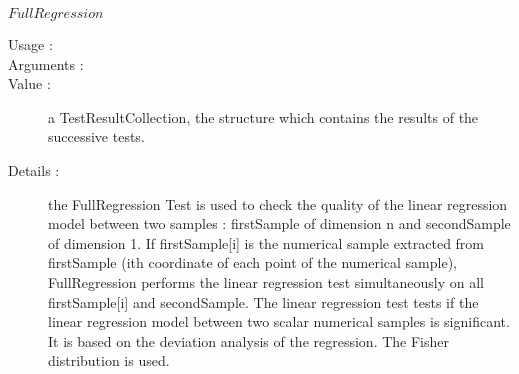 \begin{description}
\begin{description}
  \item $FullRegression$
    \begin{description}
    \item[Usage :] \rule{0pt}{1em}
    \item[Arguments :] \rule{0pt}{1em}
    \item[Value :]  a TestResultCollection, the structure which contains the results of the successive tests.
    \item[Details :] the FullRegression Test is used to check the quality of the linear regression model between two samples :  firstSample of dimension n and secondSample of dimension 1. If firstSample[i] is the numerical sample extracted from firstSample (ith coordinate of each point of the numerical sample), FullRegression performs the linear regression test simultaneously on all firstSample[i] and secondSample. The linear regression test tests if the linear regression model between two scalar numerical samples is significant. It is based on the deviation analysis of the regression. The Fisher distribution is used.
    \end{description}
    \bigskip


\end{description}
\end{description}
